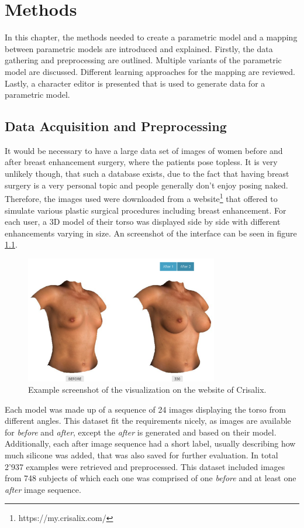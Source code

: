 \chapter{Methods}
In this chapter, the methods needed to create a parametric model and a mapping between parametric models are introduced and explained. Firstly, the data gathering and preprocessing are outlined. Multiple variants of the parametric model are discussed. Different learning approaches for the mapping are reviewed. Lastly, a character editor is presented that is used to generate data for a parametric model.

\section{Data Acquisition and Preprocessing}
It would be necessary to have a large data set of images of women before and after breast enhancement surgery, where the patients pose topless. It is very unlikely though, that such a database exists, due to the fact that having breast surgery is a very personal topic and people generally don't enjoy posing naked. Therefore, the images used were downloaded from a website\footnote{https://my.crisalix.com/} that offered to simulate various plastic surgical procedures including breast enhancement. For each user, a 3D model of their torso was displayed side by side with different enhancements varying in size. An screenshot of the interface can be seen in figure \ref{fig:websiteExample}.\\

\begin{figure}[h]
\centering
\includegraphics[width=0.75\textwidth]{figures/websiteExample}
\caption[Website UI example]{Example screenshot of the visualization on the website of Crisalix.}
\label{fig:websiteExample}
\end{figure}

Each model was made up of a sequence of 24 images displaying the torso from different angles. This dataset fit the requirements nicely, as images are available for \textit{before} and \textit{after}, except the \textit{after} is generated and based on their model. Additionally, each after image sequence had a short label, usually describing how much silicone was added, that was also saved for further evaluation. In total 2'937 examples were retrieved and preprocessed. This dataset included images from 748 subjects of which each one was comprised of one \textit{before} and at least one \textit{after} image sequence.\\

